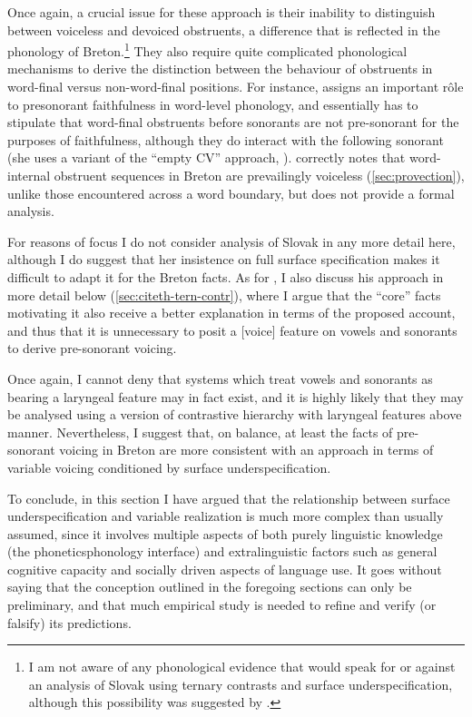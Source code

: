Once again, a crucial issue for these approach is their inability to distinguish between voiceless and devoiced obstruents, a difference that is reflected in the phonology of Breton.\footnote{I am not aware of any phonological evidence that would speak for or against an analysis of Slovak using ternary contrasts and surface underspecification, although this possibility was suggested by \citet{uffmann09:_to_bi_or_not_to_bi}.} They also require quite complicated phonological mechanisms to derive the distinction between the behaviour of obstruents in word\hyp final versus non\hyp word\hyp final positions. For instance, \citet{blaho-diss} assigns an important rôle to presonorant faithfulness \citep{lombardi95:_book,rubach08:_prevoc,beckman09:_german} in word\hyp level phonology, and essentially has to stipulate that word\hyp final obstruents before sonorants are not pre\hyp sonorant for the purposes of faithfulness, although they do interact with the following sonorant (she uses a variant of the \enquote{empty CV} approach, \cf \citealt{scheer04}). \citet{hall09:_laryn_breton} correctly notes that word\hyp internal obstruent sequences in Breton are prevailingly voiceless (\cf \cref{sec:provection}), unlike those encountered across a word boundary, but does not provide a formal analysis.

For reasons of focus I do not consider  analysis of Slovak in any more detail here, although I do suggest that her insistence on full surface specification makes it difficult to adapt it for the Breton facts. As for \citet{hall09:_laryn_breton}, I also discuss his approach in more detail below (\cref{sec:citeth-tern-contr}), where I argue that the \enquote{core} facts motivating it also receive a better explanation in terms of the proposed account, and thus that it is unnecessary to posit a [voice] feature on vowels and sonorants to derive pre\hyp sonorant voicing.

Once again, I cannot deny that systems which treat vowels and sonorants as bearing a laryngeal feature may in fact exist, and it is highly likely that they may be analysed using a version of  contrastive hierarchy with laryngeal features above manner. Nevertheless, I suggest that, on balance, at least the facts of pre\hyp sonorant voicing in Breton are more consistent with an approach in terms of variable voicing conditioned by surface underspecification.

To conclude, in this section I have argued that the relationship between surface underspecification and variable realization is much more complex than usually assumed, since it involves multiple aspects of both purely linguistic knowledge (\ie the phonetics\endash phonology interface) and extralinguistic factors such as general cognitive capacity and socially driven aspects of language use. It goes without saying that the conception outlined in the foregoing sections can only be preliminary, and that much empirical study is needed to refine and verify (or falsify) its predictions.



